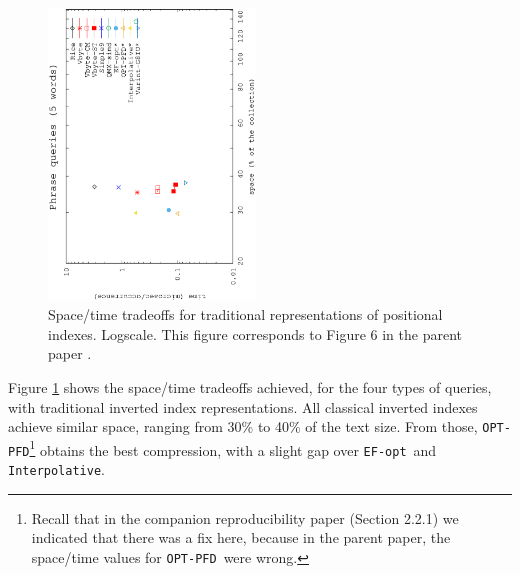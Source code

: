 \documentclass[review]{elsarticle}
\newcommand{\vbyte}{\texttt{Vbyte}}
\newcommand{\rice}{\texttt{Rice}}
\newcommand{\simplen}{\texttt{Simple9}}
\newcommand{\qmx}{\texttt{QMX}}
\newcommand{\vbyteST}{\texttt{Vbyte-ST}}
\newcommand{\interpolative}{\texttt{Interpolative}}
\newcommand{\efopt}{\texttt{EF-opt}}
\newcommand{\optpfd}{\texttt{OPT-PFD}}
\newcommand{\varint}{\texttt{varintG8IU}}
\begin{document}
\begin{figure}[t]
\begin{center}
\includegraphics[angle=-90,width=0.49\textwidth]{../figures/f3/phrases5-5/locate-5_5.eps}
\caption{Space/time tradeoffs for traditional representations of positional indexes. Logscale. This figure corresponds to Figure 6 in the parent paper \cite{CFMNis16.3}.}
\label{fig:pos}
\end{center}
\end{figure}

Figure \ref{fig:pos} shows the space/time tradeoffs achieved, for the four
types of queries, with traditional inverted index representations.
All classical inverted indexes achieve similar space, ranging from 30\% to 40\% of the text size.  From those, \optpfd \footnote{Recall that in the companion reproducibility paper (Section 2.2.1) we indicated that there was a fix here, because in the parent paper, the space/time values for \optpfd\ were wrong. }  obtains the best compression, with a slight gap over \efopt\ and \interpolative. 


% 
% 
\end{document}
